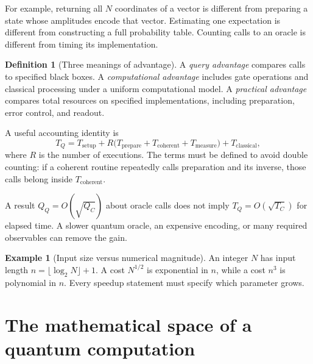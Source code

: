 \documentclass[11pt,a4paper]{article}
\theoremstyle{definition}
\newtheorem{definition}[theorem]{Definition}
\newtheorem{example}[theorem]{Example}
\theoremstyle{remark}
\numberwithin{equation}{section}
\begin{document}
For example, returning all $N$ coordinates of a vector is different from
preparing a state whose amplitudes encode that vector. Estimating one
expectation is different from constructing a full probability table. Counting
calls to an oracle is different from timing its implementation.

\begin{definition}[Three meanings of advantage]
A \emph{query advantage} compares calls to specified black boxes.
A \emph{computational advantage} includes gate operations and classical
processing under a uniform computational model.
A \emph{practical advantage} compares total resources on specified
implementations, including preparation, error control, and readout.
\end{definition}

A useful accounting identity is
\begin{equation}\label{eq:ledger}
 T_Q=T_{\mathrm{setup}}+
 R\bigl(T_{\mathrm{prepare}}+T_{\mathrm{coherent}}+
 T_{\mathrm{measure}}\bigr)+T_{\mathrm{classical}},
\end{equation}
where $R$ is the number of executions. The terms must be defined to avoid
double counting: if a coherent routine repeatedly calls preparation and its
inverse, those calls belong inside $T_{\mathrm{coherent}}$.

A result $Q_Q=O(\sqrt{Q_C})$ about oracle calls does not imply
$T_Q=O(\sqrt{T_C})$ for elapsed time. A slower quantum oracle, an expensive
encoding, or many required observables can remove the gain.

\begin{example}[Input size versus numerical magnitude]
An integer $N$ has input length $n=\lfloor\log_2N\rfloor+1$. A cost $N^{1/2}$
is exponential in $n$, while a cost $n^3$ is polynomial in $n$. Every
speedup statement must specify which parameter grows.
\end{example}

\section{The mathematical space of a quantum computation}\label{sec:state}
\end{document}
